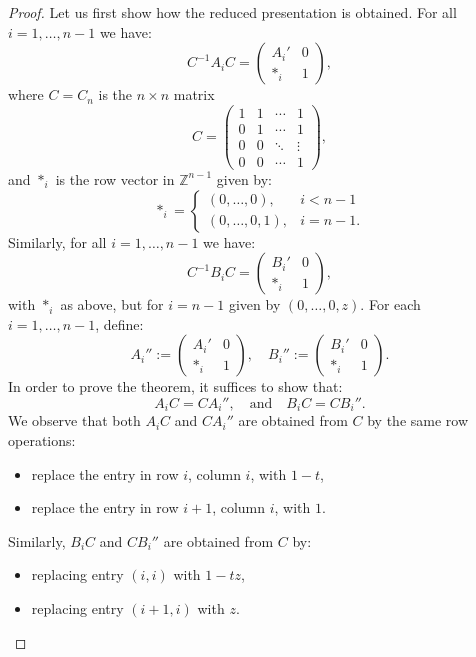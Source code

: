 \documentclass{article}
\theoremstyle{definition}
\theoremstyle{plain}
\theoremstyle{remark}
\begin{document}
\begin{proof}
Let us first show how the reduced presentation is obtained. For all $i = 1, \dots, n-1$ we have:
$$
C^{-1} A_i C =
\begin{pmatrix}
A_i' & 0 \\
\ast_i & 1
\end{pmatrix},
$$
where $C = C_n$ is the $n \times n$ matrix
$$
C =
\begin{pmatrix}
1 & 1 & \cdots & 1 \\
0 & 1 & \cdots & 1 \\
0 & 0 & \ddots & \vdots \\
0 & 0 & \cdots & 1
\end{pmatrix},
$$
and $\ast_i$ is the row vector in $\mathbb{Z}^{n-1}$ given by:
$$
\ast_i =
\begin{cases}
(0, \dots, 0), & i < n-1 \\
(0, \dots, 0, 1), & i = n-1.
\end{cases}
$$
Similarly, for all $i = 1, \dots, n-1$ we have:
$$
C^{-1} B_i C =
\begin{pmatrix}
B_i' & 0 \\
\ast_i & 1
\end{pmatrix},
$$
with $\ast_i$ as above, but for $i = n-1$ given by $(0, \dots, 0, z)$. For each $i = 1, \dots, n-1$, define:
$$
A_i'' :=
\begin{pmatrix}
A_i' & 0 \\
\ast_i & 1
\end{pmatrix},
\quad
B_i'' :=
\begin{pmatrix}
B_i' & 0 \\
\ast_i & 1
\end{pmatrix}.
$$
In order to prove the theorem, it suffices to show that:
$$
A_i C = C A_i'', \quad \text{and} \quad B_i C = C B_i''.
$$
We observe that both $A_i C$ and $C A_i''$ are obtained from $C$ by the same row operations:
\begin{itemize}
    \item replace the entry in row $i$, column $i$, with $1 - t$,
    \item replace the entry in row $i+1$, column $i$, with $1$.
\end{itemize}
Similarly, $B_i C$ and $C B_i''$ are obtained from $C$ by:
\begin{itemize}
    \item replacing entry $(i,i)$ with $1 - tz$,
    \item replacing entry $(i+1,i)$ with $z$.
\end{itemize}


\end{proof}
\end{document}
